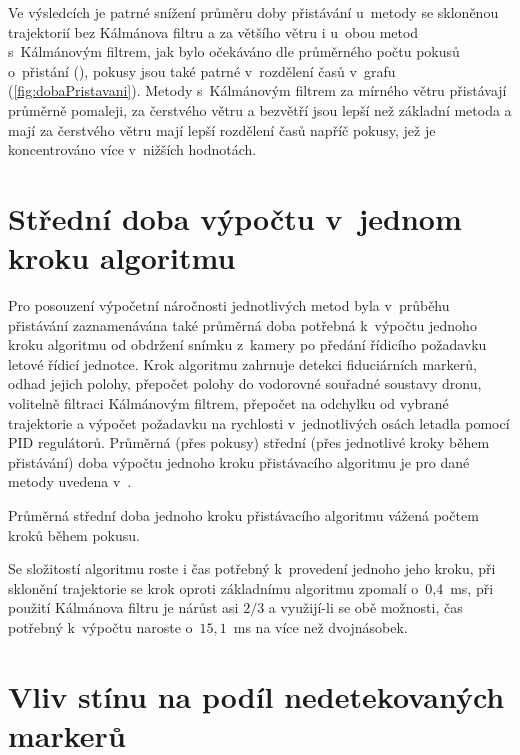     Ve výsledcích je patrné snížení průměru doby přistávání u~metody se skloněnou trajektorií bez Kálmánova filtru a za většího větru i u~obou metod s~Kálmánovým filtrem, jak bylo očekáváno dle průměrného počtu pokusů o~přistání (), pokusy jsou také patrné v~rozdělení časů v~grafu (\cref{fig:dobaPristavani}). Metody s~Kálmánovým filtrem za mírného větru přistávají průměrně pomaleji, za čerstvého větru a bezvětří jsou lepší než základní metoda a mají za čerstvého větru mají lepší rozdělení časů napříč pokusy, jež je koncentrováno více v~nižších hodnotách.
    

  \section{Střední doba výpočtu v~jednom kroku algoritmu} \label{sec:stredniDobaVypoctu}
    Pro posouzení výpočetní náročnosti jednotlivých metod byla v~průběhu přistávání zaznamenávána také průměrná doba potřebná k~výpočtu jednoho kroku algoritmu od obdržení snímku z~kamery po předání řídicího požadavku letové řídicí jednotce. Krok algoritmu zahrnuje detekci fiduciárních markerů, odhad jejich polohy, přepočet polohy do vodorovné souřadné soustavy dronu, volitelně filtraci Kálmánovým filtrem, přepočet na odchylku od vybrané trajektorie a výpočet požadavku na rychlosti v~jednotlivých osách letadla pomocí PID regulátorů. Průměrná (přes pokusy) střední (přes jednotlivé kroky během přistávání) doba výpočtu jednoho kroku přistávacího algoritmu je pro dané metody uvedena v~.

    \begin{table}
      \centering
      
      \caption[Průměrná střední doba jednoho kroku algoritmu]{Průměrná střední doba jednoho kroku přistávacího algoritmu vážená počtem kroků během pokusu.}
      \label{tab:dobaKroku}
    \end{table}

    Se složitostí algoritmu roste i čas potřebný k~provedení jednoho jeho kroku, při sklonění trajektorie se krok oproti základnímu algoritmu zpomalí o~0{,}4~ms, při použití Kálmánova filtru je nárůst asi $2/3$ a využijí-li se obě možnosti, čas potřebný k~výpočtu naroste o~$15{,}1$~ms na více než dvojnásobek.
  \section{Vliv stínu na podíl nedetekovaných markerů} \label{sec:stin}%
    
